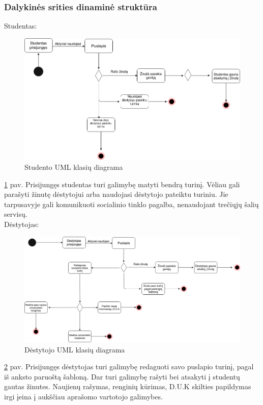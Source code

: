 \documentclass{VUMIFPSkursinis}
\begin{document}
\subsubsection{Dalykinės srities dinaminė struktūra}
Studentas:
\begin{figure}[H]
\centering
\includegraphics[width=\linewidth]{img/studentas.png}
\caption{Studento UML klasių diagrama}
\label{fig:studentu}
\end{figure}
\ref{fig:studentu} pav. Prisijungęs studentas turi galimybę matyti bendrą turinį. Vėliau gali parašyti žinutę dėstytojui arba naudojasi dėstytojo pateiktu turiniu. Jie tarpusavyje gali komunikuoti socialinio tinklo pagalba, nenaudojant trečiųjų šalių servisų.\\
Dėstytojas: \\
\begin{figure}[H]
\centering
\includegraphics[width=\linewidth]{img/destytojas.png}
\caption{Dėstytojo UML klasių diagrama}
\label{fig:destytoju}
\end{figure}
\ref{fig:destytoju} pav. Prisijungęs dėstytojas turi galimybę redaguoti savo puslapio turinį, pagal iš anksto paruoštą šabloną. Dar turi galimybę rašyti bei atsakyti į studentų gautas žinutes. Naujienų rašymas, renginių kūrimas, D.U.K skilties papildymas irgi įeina į aukščiau aprašomo vartotojo galimybes.\\
\end{document}
